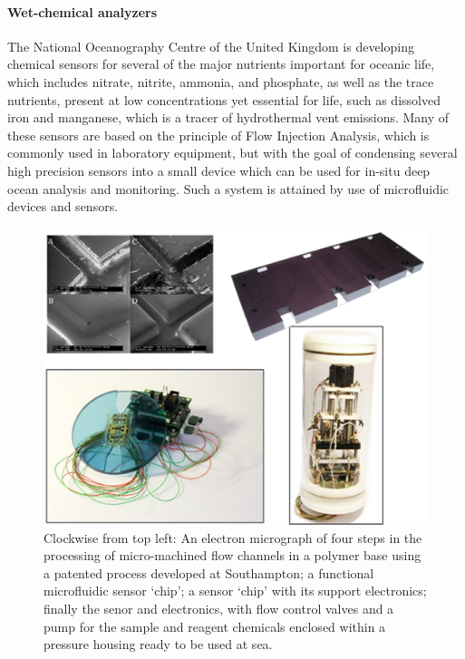 \paragraph{Wet-chemical analyzers \cite{chemical_microsensors}}
The National Oceanography Centre of the United Kingdom is developing chemical sensors for several of the major nutrients important for oceanic life, which includes nitrate, nitrite, ammonia, and phosphate, as well as the trace nutrients, present at low concentrations yet essential for life, such as dissolved iron and manganese, which is a tracer of hydrothermal vent emissions.  Many of these sensors are based on the principle of Flow Injection Analysis, which is commonly used in laboratory equipment, but with the goal of condensing several high precision sensors into a small device which can be used for in-situ deep ocean analysis and monitoring. Such a system is attained by use of microfluidic devices and sensors.
\begin{figure}[htb]
	\centering
	\includegraphics[width=\textwidth]{figures/mlh/microsensors_chem_img1.png}
	\caption{Clockwise from top left: An electron micrograph of four steps in the processing of micro-machined flow channels in a polymer base using a patented process developed at Southampton; a functional microfluidic sensor ‘chip’; a sensor ‘chip’ with its support electronics; finally the senor and electronics, with flow control valves and a pump for the sample and reagent chemicals enclosed within a pressure housing ready to be used at sea.\cite{chemical_microsensors}}
	\label{fig:chemical_microsensors}
\end{figure}

